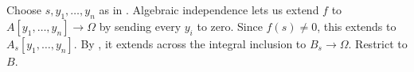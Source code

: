 Choose $s,y_1,\ldots,y_n$ as in . Algebraic independence lets us extend $f$ to $A[y_1,\ldots,y_n]\to\Omega$ by sending every $y_i$ to zero. Since $f(s)\neq0$, this extends to $A_s[y_1,\ldots,y_n]$. By , it extends across the integral inclusion to $B_s\to\Omega$. Restrict to $B$.
